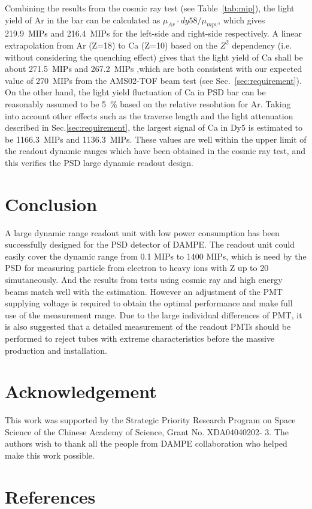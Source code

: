 \documentclass[preprint, times]{elsarticle}
\begin{document}
Combining the results from the cosmic ray test (see Table~\ref{tab:mip}), the light yield of Ar in the bar can be calculated as ${\mu_{Ar}\cdot dy58} / {\mu_{mpv}}$, which gives \SI{219.9}{MIPs} and \SI{216.4}{MIPs} for the left-side and right-side respectively.
A linear extrapolation from Ar (Z=18) to Ca (Z=10) based on the $Z^2$ dependency (i.e. without considering the quenching effect) gives that the light yield of Ca shall be about \SI{271.5}{MIPs} and \SI{267.2}{MIPs} ,which are both consistent with our expected value of \SI{270}{MIPs} from the AMS02-TOF beam test (see Sec.~\ref{sec:requirement}). 
On the other hand, the light yield fluctuation of Ca in PSD bar can be reasonably assumed to be \SI{5}{\percent} based on the relative resolution for Ar.
Taking into account other effects such as the traverse length and the light attenuation described in Sec.\ref{sec:requirement}, the largest signal of Ca in Dy5 is estimated to be \SI{1166.3}{MIPs} and \SI{1136.3}{MIPs}.
These values are well within the upper limit of the readout dynamic ranges which have been obtained in the cosmic ray test, and this verifies the PSD large dynamic readout design.


\section{Conclusion}
\label{sec:conclusion}
A large dynamic range readout unit with low power consumption has been successfully designed for the PSD detector of DAMPE.
The readout unit could easily cover the dynamic range from 0.1 MIPs to 1400 MIPs, which is need by the PSD for measuring particle from electron to heavy ions with Z up to 20 simutaneously. And the results from tests using cosmic ray and high energy beams match well with the estimation.
However an adjustment of the PMT supplying voltage is required to obtain the optimal performance and make full use of the measurement range. Due to the large individual differences of PMT, it is also suggested that a detailed measurement of the readout PMTs should be performed to reject tubes with extreme characteristics before the massive production and installation.

\section*{Acknowledgement}
\label{sec:acknowledgement}

This work was supported by the Strategic Priority Research Program on Space Science of the Chinese Academy of Science,
Grant No. XDA04040202- 3.
The authors wish to thank all the people from DAMPE collaboration who helped make this work possible.

\section*{References}
\label{sec:reference}



\end{document}
